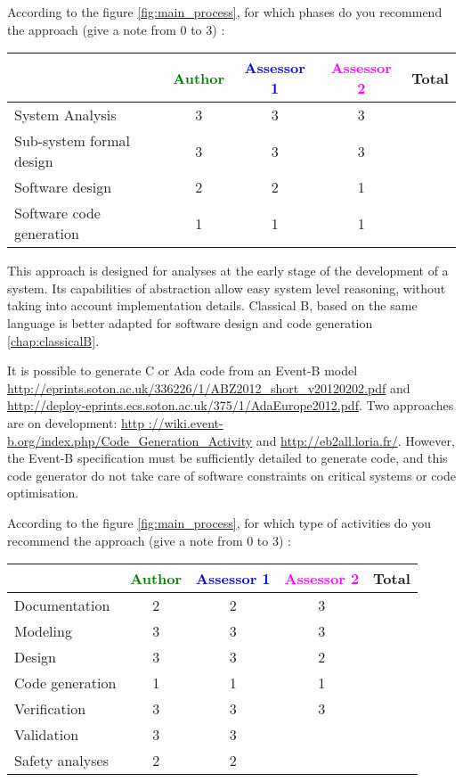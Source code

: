 According to the figure \ref{fig:main_process}, for which phases do you recommend the approach (give a note from 0 to  3) :

\begin{tabular}{|l | c | c | c | c|}
\hline
& \textcolor{green}{Author} & \textcolor{blue}{Assessor 1} & \textcolor{magenta}{Assessor 2} & Total \\
\hline 
System Analysis & 3 & 3 & 3 &  \\
\hline
Sub-system formal design & 3 & 3 & 3 & \\
\hline
Software design & 2 & 2 & 1 & \\
\hline
Software code generation & 1 & 1 & 1 & \\
\hline
\end{tabular}

\begin{author_comment}
This approach is designed for analyses at the early stage of the development of a system. Its capabilities of abstraction allow easy system level reasoning, without taking into account implementation details. Classical B, based on the same language is better adapted for software design and code generation \ref{chap:classicalB}.

It is possible to generate C or Ada code from an Event-B model \url{http://eprints.soton.ac.uk/336226/1/ABZ2012_short_v20120202.pdf} and \url{http://deploy-eprints.ecs.soton.ac.uk/375/1/AdaEurope2012.pdf}. Two  approaches are on development: \url{http ://wiki.event-b.org/index.php/Code_Generation_Activity} and \url{http://eb2all.loria.fr/}. However, the Event-B specification must be sufficiently detailed to generate code, and this code generator do not take care of software constraints on critical systems or code optimisation.
\end{author_comment}


According to the figure \ref{fig:main_process}, for which type of activities do you recommend the approach (give a note from 0 to  3) :

\begin{tabular}{|l | c | c | c | c|}
\hline
& \textcolor{green}{Author} & \textcolor{blue}{Assessor 1} & \textcolor{magenta}{Assessor 2} & Total \\
\hline 
Documentation & 2 & 2 & 3 &  \\
\hline
Modeling & 3 & 3 & 3 &  \\
\hline
Design & 3 & 3 & 2 & \\
\hline
Code generation & 1 & 1 & 1 & \\
\hline
Verification & 3 & 3 & 3 & \\
\hline
Validation & 3 & 3 & & \\
\hline
Safety analyses & 2 & 2 & & \\
\hline
\end{tabular}

